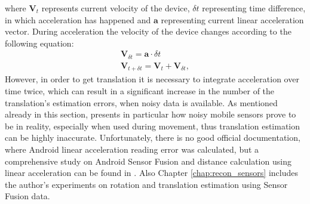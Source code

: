 where $\textbf{V}_{t}$ represents current velocity of the device, $\delta t$ representing time difference, in which acceleration has happened and $\textbf{a}$ representing current linear acceleration vector. During acceleration the velocity of the device changes according to the following equation: 
\begin{equation}\label{eq:velo_accel}
\begin{array}{c}
\textbf{V}_{\delta t} = \textbf{a} \cdot \delta t \\
\textbf{V}_{t + \delta t} = \textbf{V}_{t} + \textbf{V}_{\delta t},
\end{array}
\end{equation}
However, in order to get translation it is necessary to integrate acceleration over time twice, which can result in a significant increase in the number of the translation's estimation errors, when noisy data is available. 
As mentioned already in this section, \cite{website:androidSensorFusion} presents in particular how noisy mobile sensors prove to be in reality, especially when used during movement, thus translation estimation can be highly inaccurate.
Unfortunately, there is no good official documentation, where Android linear acceleration reading error was calculated, but a comprehensive study on Android Sensor Fusion and distance calculation using linear acceleration can be found in \cite{indoorPosition}. Also Chapter \ref{chap:recon_sensors} includes the author's experiments on rotation and translation estimation using Sensor Fusion data.
